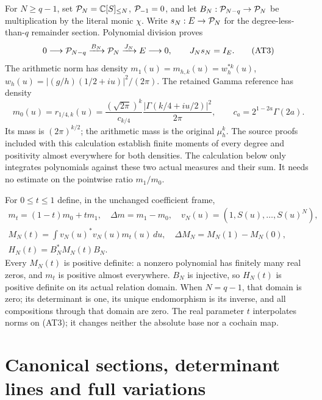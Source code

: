 For $N\ge q-1$, set $\mathcal P_N=\mathbb{C}[S]_{\le N}$,
$\mathcal P_{-1}=0$, and let
$B_N:\mathcal P_{N-q}\to\mathcal P_N$ be multiplication by the literal monic
$\chi$. Write $s_N:E\to\mathcal P_N$ for the degree-less-than-$q$
remainder section. Polynomial division proves
\[
 0\longrightarrow\mathcal P_{N-q}\xrightarrow{B_N}\mathcal P_N
       \xrightarrow{J_N}E\longrightarrow0,
 \qquad J_Ns_N=I_E.                         \tag{AT3}
\]
The arithmetic norm has density
$m_1(u)=m_{h,k}(u)=w_h^{*k}(u)$,
$w_h(u)=|(g/h)(1/2+iu)|^2/(2\pi)$.
The retained Gamma reference has density
\[
 m_0(u)=r_{1/4,k}(u)
 =\frac{(\sqrt{2\pi})^k}{c_{k/4}}
       \frac{|\Gamma(k/4+iu/2)|^2}{2\pi},
 \qquad c_a=2^{1-2a}\Gamma(2a).              \tag{AT4}
\]
Its mass is $(2\pi)^{k/2}$; the arithmetic mass is the original
$\mu_h^k$. The source proofs included with this calculation establish
finite moments of every degree and positivity almost everywhere for
both densities. The calculation below only integrates polynomials
against these two actual measures and their sum. It needs no estimate
on the pointwise ratio $m_1/m_0$.

For $0\le t\le1$ define, in the unchanged coefficient frame,
\[
 \begin{gathered}
 m_t=(1-t)m_0+tm_1,\quad \Delta m=m_1-m_0,
 \quad v_N(u)=(1,S(u),\ldots,S(u)^N),\\
 M_N(t)=\int v_N(u)^*v_N(u)m_t(u)\,du,
 \quad \Delta M_N=M_N(1)-M_N(0),\\
 H_N(t)=B_N^*M_N(t)B_N.                     \end{gathered}
 \tag{AT5}
\]
Every $M_N(t)$ is positive definite: a nonzero polynomial has finitely
many real zeros, and $m_t$ is positive almost everywhere. $B_N$ is
injective, so $H_N(t)$ is positive definite on its actual relation
domain. When $N=q-1$, that domain is zero; its determinant is one,
its unique endomorphism is its inverse, and all compositions through
that domain are zero. The real parameter $t$ interpolates norms on
(AT3); it changes neither the absolute base nor a cochain map.

\section{Canonical sections, determinant lines and full variations}

